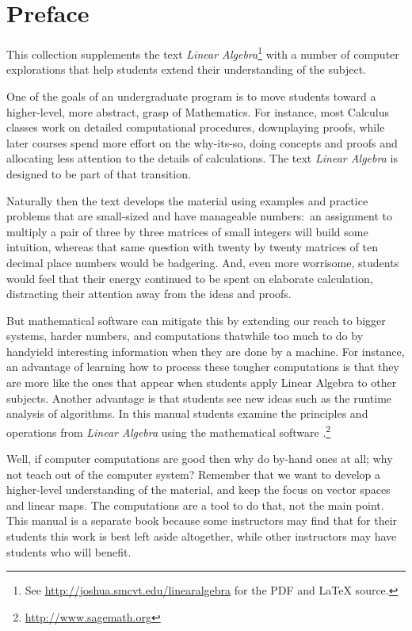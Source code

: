 \chapter*{Preface}\pagestyle{preface}\thispagestyle{preface}


This collection supplements the text \nocite{Hefferon12}
\textit{Linear Algebra}\footnote{See \protect\url{http://joshua.smcvt.edu/linearalgebra} for the PDF and \protect\LaTeX{} source.}
with a number of computer explorations that help students
extend their understanding of the subject.

One of the goals of an undergraduate program is to move students 
toward a higher-level, more abstract, grasp of Mathematics.
For instance, most Calculus classes work on detailed computational procedures,
downplaying proofs, 
while later courses spend more effort on the why-its-so, 
doing concepts and proofs and allocating 
less attention to the details of calculations.  
The text \textit{Linear Algebra} is designed 
to be part of that transition.

Naturally then the text develops the material 
using examples and practice problems
that are small-sized and have manageable numbers:~an 
assignment to multiply a pair of three by three matrices
of small integers will build some intuition, whereas that same 
question with twenty by twenty matrices
of ten decimal place numbers would be badgering. 
And, even more worrisome, students would feel that their energy continued
to be spent on elaborate calculation, distracting their attention away from 
the ideas and proofs.

But mathematical software can mitigate this by extending 
our reach to bigger systems,
harder numbers, and computations 
that\Dash while too much to do by hand\Dash yield
interesting information when they are done by a machine.
For instance, an advantage of learning how to process these tougher computations is that 
they are more like the ones that appear when students apply Linear 
Algebra to other subjects.
Another advantage is that students see new ideas such as 
the runtime analysis of algorithms.
In this manual students examine the principles and operations 
from \textit{Linear Algebra} using 
the mathematical software \Sage{}.\footnote{\url{http://www.sagemath.org}}

Well, if computer computations are good then why do by-hand ones at all; why not
teach out of the computer system?
Remember that we want to develop a higher-level understanding of the material, and
keep the focus on vector spaces and linear maps.
The computations are a tool to do that, not the main point.
This manual is a separate book because some instructors may find 
that for their students
this work is best left aside altogether, 
while other instructors may have students who
will benefit.



